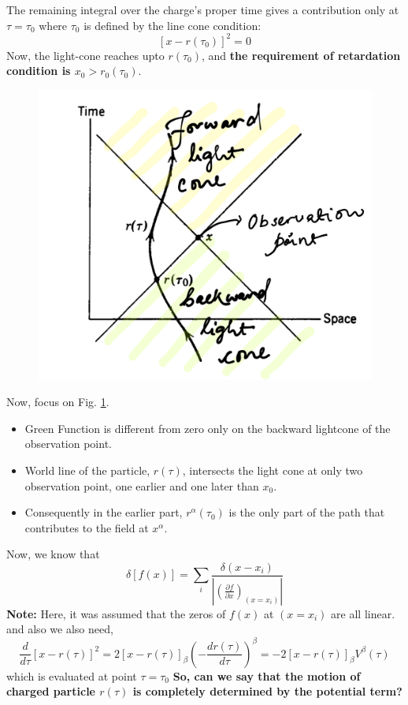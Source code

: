\documentclass[12pt]{report}
\newcommand{\pe}[2]{\frac{\partial{#1}}{\partial{#2}}}
\newcommand{\cc}[1]{\left({#1}\right)}
\newcommand{\rr}[1]{\left[{#1}\right]}
\begin{document}
The remaining integral over the charge's proper time gives a contribution only at $\tau=\tau_0$ where $\tau_0$ is defined by the line cone condition:
\begin{equation}\label{lc}
\rr{x-r(\tau_0)}^2=0
\end{equation}
Now, the light-cone reaches upto $r(\tau_0)$, and \textbf{the requirement of retardation condition is $x_0>r_0(\tau_0)$}.
\begin{figure}[h!]
\includegraphics[width=0.7\linewidth]{lienardpot.png}
\label{radlineard}
\end{figure}
Now, focus on Fig. \ref{radlineard}. 
\begin{itemize}
\item Green Function is different from zero only on the backward lightcone of the observation point.
\item World line of the particle, $r(\tau)$, intersects the light cone at only two observation point, one earlier and one later than $x_0$.
\item Consequently in the earlier part, $r^\alpha(\tau_0)$ is the only part of the path that contributes to the field at $x^\alpha$.
\end{itemize}
Now, we know that
\begin{equation}\label{deltatau}
\delta[f(x)]=\sum_i \frac{\delta(x-x_i)}{|\cc{\pe{f}{x}}_{(x=x_i)}|}
\end{equation}
\textbf{Note:} Here, it was assumed that the zeros of $f(x)$ at $(x=x_i)$ are all linear.\\
and also we also need,
\begin{equation}
\frac{d}{d\tau}\rr{x-r(\tau)}^2 =2\rr{x-r(\tau)}_\beta \cc{-\frac{d r(\tau)}{d\tau}}^\beta=-2\rr{x-r(\tau)}_\beta V^\beta(\tau)
\end{equation}
which is evaluated at point $\tau=\tau_0$
\textbf{So, can we say that the motion of charged particle $r(\tau)$ is completely determined by the potential term?}
\end{document}
